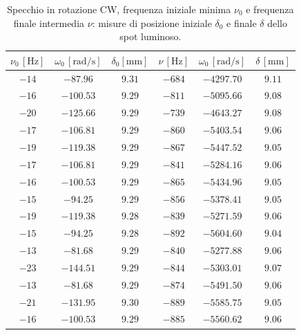 \documentclass[]{article}
\begin{document}
    \begin {table}
        \centering
         \begin{tabular}{||c|c|c||c|c|c||}
            \hline
            $\nu_0\, [\text{Hz}] $ & $\omega_0\, [\text{rad/s}] $ & $\delta_0 [\text{mm}] $ & $\nu\, [\text{Hz}] $ & $\omega_0\, [\text{rad/s}] $ & $\delta\, [\text{mm}] $ \\
            \hline\hline
            $-14$ & $-87.96  $ & $9.31$ & $-684$ & $-4297.70$ & $9.11$\\\hline
            $-16$ & $-100.53 $ & $9.29$ & $-811$ & $-5095.66$ & $9.08$\\\hline
            $-20$ & $-125.66 $ & $9.29$ & $-739$ & $-4643.27$ & $9.08$\\\hline
            $-17$ & $-106.81 $ & $9.29$ & $-860$ & $-5403.54$ & $9.06$\\\hline
            $-19$ & $-119.38 $ & $9.29$ & $-867$ & $-5447.52$ & $9.05$\\\hline
            $-17$ & $-106.81 $ & $9.29$ & $-841$ & $-5284.16$ & $9.06$\\\hline
            $-16$ & $-100.53 $ & $9.29$ & $-865$ & $-5434.96$ & $9.05$\\\hline
            $-15$ & $-94.25  $ & $9.29$ & $-856$ & $-5378.41$ & $9.05$\\\hline
            $-19$ & $-119.38 $ & $9.28$ & $-839$ & $-5271.59$ & $9.06$\\\hline
            $-15$ & $-94.25  $ & $9.28$ & $-892$ & $-5604.60$ & $9.04$\\\hline
            $-13$ & $-81.68  $ & $9.29$ & $-840$ & $-5277.88$ & $9.06$\\\hline
            $-23$ & $-144.51 $ & $9.29$ & $-844$ & $-5303.01$ & $9.07$\\\hline
            $-13$ & $-81.68  $ & $9.29$ & $-874$ & $-5491.50$ & $9.06$\\\hline
            $-21$ & $-131.95 $ & $9.30$ & $-889$ & $-5585.75$ & $9.05$\\\hline
            $-16$ & $-100.53 $ & $9.29$ & $-885$ & $-5560.62$ & $9.06$\\\hline
        \end{tabular}
        \caption{Specchio in rotazione CW, frequenza iniziale minima $\nu_0$ e frequenza finale intermedia $\nu$: misure di posizione iniziale $\delta_0$ e finale $\delta$ dello spot luminoso.}
        \label{CW_min_mid-delta-omega}
    \end{table}
\end{document}
